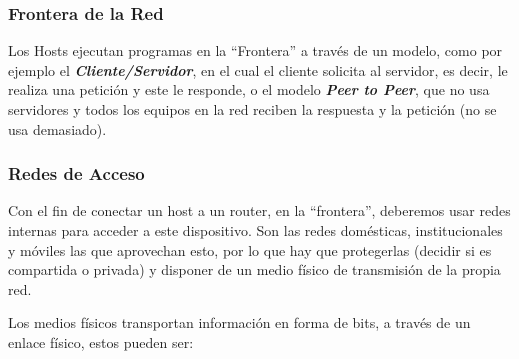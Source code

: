 \subsubsection{Frontera de la Red}
\noindent Los Hosts ejecutan programas en la ``Frontera'' a través de un modelo, como por ejemplo el \textit{\textbf{Cliente/Servidor}}, en el cual el cliente solicita al servidor, es decir, le realiza una petición y este le responde, o el modelo \textit{\textbf{Peer to Peer}}, que no usa servidores y todos los equipos en la red reciben la respuesta y la petición (no se usa demasiado).
\subsubsection{Redes de Acceso}
\noindent Con el fin de conectar un host a un router, en la ``frontera'', deberemos usar redes internas para acceder a este dispositivo. Son las redes domésticas, institucionales y móviles las que aprovechan esto, por lo que hay que protegerlas (decidir si es compartida o privada) y disponer de un medio físico de transmisión de la propia red.
\vspace{.5cm}
\par \noindent Los medios físicos transportan información en forma de bits, a través de un enlace físico, estos pueden ser:
